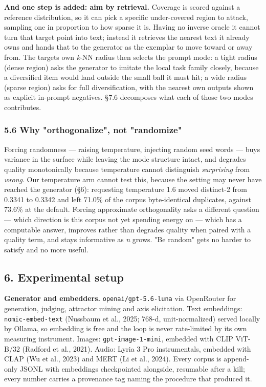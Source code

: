 \documentclass[
  10pt,
]{article}
\theoremstyle{plain}
\theoremstyle{definition}
\begin{document}
\textbf{And one step is added: aim by retrieval.} Coverage is scored
against a reference distribution, so it can pick a specific
under-covered region to attack, sampling one in proportion to how sparse
it is. Having no inverse oracle it cannot turn that target point into
text; instead it retrieves the nearest text it already owns and hands
that to the generator as the exemplar to move toward or away from. The
target\textquotesingle s own \emph{k}-NN radius then selects the prompt
mode: a tight radius (dense region) asks the generator to imitate the
local task family closely, because a diversified item would land outside
the small ball it must hit; a wide radius (sparse region) asks for full
diversification, with the nearest own outputs shown as explicit
in-prompt negatives. §7.6 decomposes what each of those two modes
contributes.

\subsubsection{5.6 Why "orthogonalize", not
"randomize"}\label{56-why-orthogonalize-not-randomize}

Forcing randomness --- raising temperature, injecting random seed words
--- buys variance in the surface while leaving the mode structure
intact, and degrades quality monotonically because temperature cannot
distinguish \emph{surprising} from \emph{wrong}. Our temperature arm
cannot test this, because the setting may never have reached the
generator (§6): requesting temperature 1.6 moved distinct-2 from 0.3341
to 0.3342 and left 71.0\% of the corpus byte-identical duplicates,
against 73.6\% at the default. Forcing approximate orthogonality asks a
different question --- which direction is this corpus not yet spending
energy on --- which has a computable answer, improves rather than
degrades quality when paired with a quality term, and stays informative
as \emph{n} grows. "Be random" gets no harder to satisfy and no more
useful.

\subsection{6. Experimental setup}\label{6-experimental-setup}

\textbf{Generator and embedders.} \texttt{openai/gpt-5.6-luna} via
OpenRouter for generation, judging, attractor mining and axis
elicitation. Text embeddings: \texttt{nomic-embed-text} (Nussbaum et
al., 2025; 768-d, unit-normalized) served locally by Ollama, so
embedding is free and the loop is never rate-limited by its own
measuring instrument. Images: \texttt{gpt-image-1-mini}, embedded with
CLIP ViT-B/32 (Radford et al., 2021). Audio: Lyria 3 Pro instrumentals,
embedded with CLAP (Wu et al., 2023) and MERT (Li et al., 2024). Every
corpus is append-only JSONL with embeddings checkpointed alongside,
resumable after a kill; every number carries a provenance tag naming the
procedure that produced it.
\end{document}
